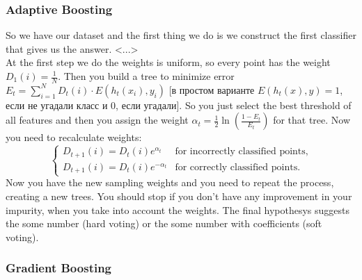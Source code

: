 \subsubsection*{Adaptive Boosting}

So we have our dataset and the first thing we do is we construct the first classifier that gives us the answer. <...>\\
At the first step we do the weights is uniform, so every point has the weight $D_1(i)=\frac{1}{N}$. Then you build a tree to minimize error $E_t = \sum_{i=1}^N D_t(i) \cdot E(h_t(x_i), y_i)$ [в простом варианте $E(h_t(x),y) = 1$, если не угадали класс и $0$, если угадали]. So you just select the best threshold of all features and then you assign the weight $\alpha_t=\frac{1}{2}\ln(\frac{1-E_t}{E_t})$ for that tree. {\it <A little description of this function and how it helps us>} Now you need to recalculate weights:
$$\begin{cases}
D_{t+1}(i) = D_t(i)e^{\alpha_t}&\text{for incorrectly classified points,}\\
D_{t+1}(i)=D_t(i)e^{-\alpha_t}&\text{for correctly classified points.}
\end{cases}$$
Now you have the new sampling weights and you need to repeat the process, creating a new trees. You should stop if you don't have any improvement in your impurity, when you take into account the weights. The final hypothesys suggests the some number (hard voting) or the some number with coefficients (soft voting).\\
{\it <A slide with an example>}

\subsubsection*{Gradient Boosting}

